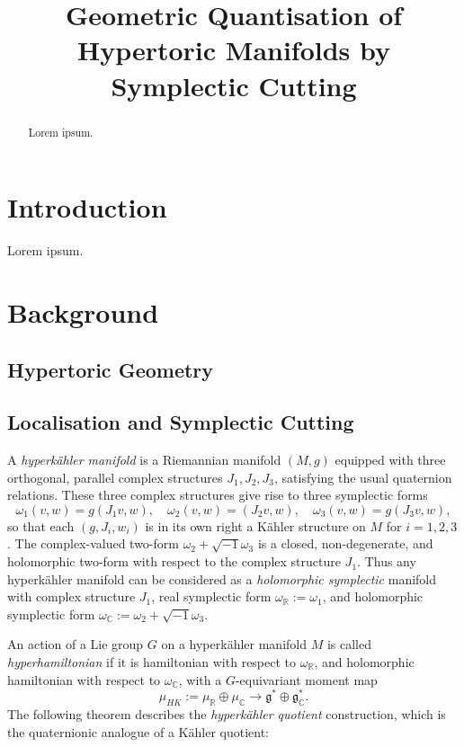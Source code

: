\documentclass{article}
\title{Geometric Quantisation of Hypertoric Manifolds by Symplectic Cutting}
\date{}	%
\newcommand{\w}{\omega}
\newcommand{\K}{K\"ahler }
\newcommand{\HK}{hyperk\"ahler }
\newcommand{\RR}{\mathbb{R}}
\newcommand{\CC}{\mathbb{C}}
\newcommand{\mf}[1]{\mathfrak{#1}}
\begin{document}
	\maketitle
	
	\begin{abstract}
		Lorem ipsum.
	\end{abstract}
	
	\section{Introduction}
	
	Lorem ipsum.
	
	\section{Background}
	
	\subsection{Hypertoric Geometry}
	
	\subsection{Localisation and Symplectic Cutting}
	
	A \emph{\HK manifold} is a Riemannian manifold $(M,g)$ equipped with three orthogonal, parallel complex structures $J_{1}, J_{2}, J_{3}$, satisfying the usual quaternion relations. These three complex structures give rise to three symplectic forms
	$$
	\w_{1}(v,w) = g(J_{1}v,w),\quad \w_{2}(v,w) = (J_{2}v,w),\quad \w_{3}(v,w) = g(J_{3}v,w),
	$$
	so that each $(g,J_{i},w_{i})$ is in its own right a \K structure on $M$ for $i = 1,2,3$. The complex-valued two-form $\w_{2} + \sqrt{-1}\w_{3}$ is a closed, non-degenerate, and holomorphic two-form with respect to the complex structure $J_{1}$. Thus any \HK manifold can be considered as a \emph{holomorphic symplectic} manifold with complex structure $J_{1}$, real symplectic form $\w_{\RR} := \w_{1}$, and holomorphic symplectic form $\w_{\CC} := \w_{2} + \sqrt{-1}\w_{3}$.
	
	An action of a Lie group $G$ on a \HK manifold $M$ is called \emph{hyperhamiltonian} if it is hamiltonian with respect to $\w_{\RR}$, and holomorphic hamiltonian with respect to $\w_{\CC}$, with a $G$-equivariant moment map
	$$
	\mu_{HK} := \mu_{\RR} \oplus \mu_{\CC} \longrightarrow \mf{g}^{\ast} \oplus \mf{g}_{\CC}^{\ast}.
	$$
	The following theorem describes the \emph{\HK quotient} construction, which is the quaternionic analogue of a \K quotient:
	
\end{document}
